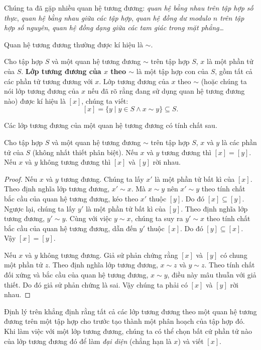 Chúng ta đã gặp nhiều quan hệ tương đương: \textit{quan hệ bằng nhau trên tập hợp số thực}, \textit{quan hệ bằng nhau giữa các tập hợp}, \textit{quan hệ đồng dư modulo $n$ trên tập hợp số nguyên}, \textit{quan hệ đồng dạng giữa các tam giác trong mặt phẳng}\ldots

Quan hệ tương đương thường được kí hiệu là $\sim$.

\begin{definition}
    Cho tập hợp $S$ và một quan hệ tương đương $\sim$ trên tập hợp $S$, $x$ là một phần tử của $S$. \@\textbf{Lớp tương đương của $x$ theo $\sim$} là một tập hợp con của $S$, gồm tất cả các phần tử tương đương với $x$. Lớp tương đương của $x$ theo $\sim$ (hoặc chúng ta nói lớp tương đương của $x$ nếu đã rõ rằng đang sử dụng quan hệ tương đương nào) được kí hiệu là $[x]$, chúng ta viết:
    \[
        [x] = \{ y \mid y\in S \wedge x\sim y \}\subseteq S.
    \]
\end{definition}

Các lớp tương đương của một quan hệ tương đương có tính chất sau.

\begin{theorem}
    Cho tập hợp $S$ và một quan hệ tương đương $\sim$ trên tập hợp $S$, $x$ và $y$ là các phần tử của $S$ (không nhất thiết phân biệt). Nếu $x$ và $y$ tương đương thì $[x] = [y]$. Nếu $x$ và $y$ không tương đương thì $[x]$ và $[y]$ rời nhau.
\end{theorem}

\begin{proof}
    Nếu $x$ và $y$ tương đương. Chúng ta lấy $x'$ là một phần tử bất kì của $[x]$. Theo định nghĩa lớp tương đương, $x'\sim x$. Mà $x\sim y$ nên $x'\sim y$ theo tính chất bắc cầu của quan hệ tương đương, kéo theo $x'$ thuộc $[y]$. Do đó $[x]\subseteq [y]$. Ngược lại, chúng ta lấy $y'$ là một phần tử bất kì của $[y]$. Theo định nghĩa lớp tương đương, $y'\sim y$. Cùng với việc $y\sim x$, chúng ta suy ra $y'\sim x$ theo tính chất bắc cầu của quan hệ tương đương, dẫn đến $y'$ thuộc $[x]$. Do đó $[y]\subseteq [x]$. Vậy $[x] = [y]$.

    Nếu $x$ và $y$ không tương đương. Giả sử phản chứng rằng $[x]$ và $[y]$ có chung một phần tử $z$. Theo định nghĩa lớp tương đương, $x\sim z$ và $y\sim z$. Theo tính chất đối xứng và bắc cầu của quan hệ tương đương, $x\sim y$, điều này mâu thuẫn với giả thiết. Do đó giả sử phản chứng là sai. Vậy chúng ta phải có $[x]$ và $[y]$ rời nhau.
\end{proof}

Định lý trên khẳng định rằng tất cả các lớp tương đương theo một quan hệ tương đương trên một tập hợp cho trước tạo thành một phân hoạch của tập hợp đó. Khi làm việc với một lớp tương đương, chúng ta có thể chọn bất cứ phần tử nào của lớp tương đương đó để làm \textit{đại diện} (chẳng hạn là $x$) và viết $[x]$.


